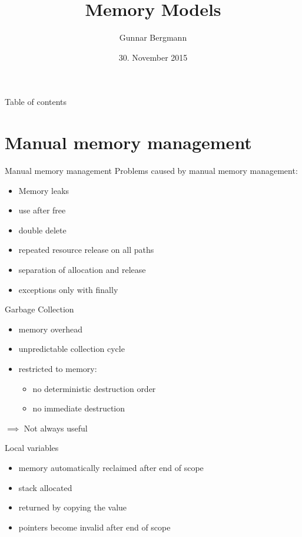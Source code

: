 \documentclass[xcolor=colortbl
]{beamer}
\title{Memory Models}
\author{Gunnar Bergmann}
\date{30. November 2015}
\begin{document}
\maketitle

\begin{frame}{Table of contents}
    \tableofcontents
\end{frame}

\section{Manual memory management}

\begin{frame}{Manual memory management}
    Problems caused by manual memory management:
    \begin{itemize}
        \item Memory leaks
        \item use after free
        \item double delete
        \item repeated resource release on all paths
        \item separation of allocation and release
        \item exceptions only with finally
    \end{itemize}
\end{frame}

\begin{frame}{Garbage Collection}
    \begin{itemize}
        \item memory overhead
        \item unpredictable collection cycle
        \item restricted to memory:
        \begin{itemize}
            \item no deterministic destruction order
            \item no immediate destruction
        \end{itemize}
    \end{itemize}
    
    $\implies$ Not always useful
\end{frame}


\begin{frame}{Local variables}
   \begin{itemize}
       \item memory automatically reclaimed after end of scope
       \item stack allocated
       \item returned by copying the value
       \item pointers become invalid after end of scope
    \end{itemize}
\end{frame}
\end{document}
